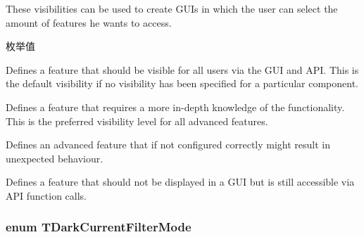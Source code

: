 These visibilities can be used to create G\+U\+Is in which the user can select the amount of features he wants to access. \begin{Desc}
\item[枚举值]\par
\begin{description}
\item[{\em 
\hypertarget{group___common_interface_gga75b333e3ba771df98bde9ee1e12f57a0a70118c45aaa1a6e1d971a537b854da23}{cv\+Beginner}\label{group___common_interface_gga75b333e3ba771df98bde9ee1e12f57a0a70118c45aaa1a6e1d971a537b854da23}
}]Defines a feature that should be visible for all users via the G\+U\+I and A\+P\+I. This is the default visibility if no visibility has been specified for a particular component. \item[{\em 
\hypertarget{group___common_interface_gga75b333e3ba771df98bde9ee1e12f57a0a268fec6360abca525e5a1305ebc543a1}{cv\+Expert}\label{group___common_interface_gga75b333e3ba771df98bde9ee1e12f57a0a268fec6360abca525e5a1305ebc543a1}
}]Defines a feature that requires a more in-\/depth knowledge of the functionality. This is the preferred visibility level for all advanced features. \item[{\em 
\hypertarget{group___common_interface_gga75b333e3ba771df98bde9ee1e12f57a0a1f5ba2e15d7bed945b49d5b9c0fffb02}{cv\+Guru}\label{group___common_interface_gga75b333e3ba771df98bde9ee1e12f57a0a1f5ba2e15d7bed945b49d5b9c0fffb02}
}]Defines an advanced feature that if not configured correctly might result in unexpected behaviour. \item[{\em 
\hypertarget{group___common_interface_gga75b333e3ba771df98bde9ee1e12f57a0a0b080f066a9129430b7dc0b7c4adf7d6}{cv\+Invisible}\label{group___common_interface_gga75b333e3ba771df98bde9ee1e12f57a0a0b080f066a9129430b7dc0b7c4adf7d6}
}]Defines a feature that should not be displayed in a G\+U\+I but is still accessible via A\+P\+I function calls. \end{description}
\end{Desc}
\hypertarget{group___common_interface_ga529300ca9481f6773a3a6f7d360191ed}{
\subsubsection[{T\+Dark\+Current\+Filter\+Mode}]{\setlength{\rightskip}{0pt plus 5cm}enum {\bf T\+Dark\+Current\+Filter\+Mode}}}\label{group___common_interface_ga529300ca9481f6773a3a6f7d360191ed}



